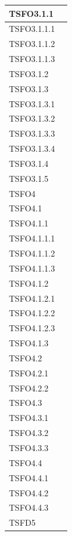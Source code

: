 \begin{center}
\begin{longtable}{ | >{\centering\arraybackslash}m{5cm} | >{\centering\arraybackslash}m{5cm} | }
				TSFO3.1.1 & \done{} \\ \hline
				TSFO3.1.1.1 & \done{} \\ \hline
				TSFO3.1.1.2 & \done{} \\ \hline
				TSFO3.1.1.3 & \done{} \\ \hline
				TSFO3.1.2 & \done{} \\ \hline
				TSFO3.1.3 & \done{} \\ \hline
				TSFO3.1.3.1 & \done{} \\ \hline
				TSFO3.1.3.2 & \done{} \\ \hline
				TSFO3.1.3.3 & \done{} \\ \hline
				TSFO3.1.3.4 & \done{} \\ \hline
				TSFO3.1.4 & \done{} \\ \hline
				TSFO3.1.5 & \done{} \\ \hline
				TSFO4 & \done{} \\ \hline
				TSFO4.1 & \done{} \\ \hline
				TSFO4.1.1 & \done{} \\ \hline
				TSFO4.1.1.1 & \done{} \\ \hline
				TSFO4.1.1.2 & \done{} \\ \hline
				TSFO4.1.1.3 & \done{} \\ \hline
				TSFO4.1.2 & \done{} \\ \hline
				TSFO4.1.2.1 & \done{} \\ \hline
				TSFO4.1.2.2 & \done{} \\ \hline
				TSFO4.1.2.3 & \done{} \\ \hline
				TSFO4.1.3 & \done{} \\ \hline
				TSFO4.2 & \done{} \\ \hline
				TSFO4.2.1 & \done{} \\ \hline
				TSFO4.2.2 & \done{} \\ \hline
				TSFO4.3 & \done{} \\ \hline
				TSFO4.3.1 & \done{} \\ \hline
				TSFO4.3.2 & \done{} \\ \hline
				TSFO4.3.3 & \done{} \\ \hline
				TSFO4.4 & \done{} \\ \hline
				TSFO4.4.1 & \done{} \\ \hline
				TSFO4.4.2 & \done{} \\ \hline
				TSFO4.4.3 & \done{} \\ \hline
				TSFD5 & \done{} \\ \hline

\end{longtable}
\end{center}

